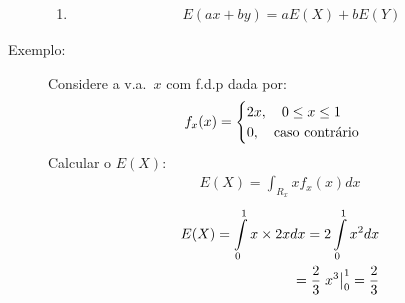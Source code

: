 \begin{description}
\begin{enumerate}[label=(\alph*)]
           \item 
           \begin{align}  E(ax + by)=aE(X)+ b E(Y)\end{align}
         \end{enumerate}
       \item [Exemplo:]Considere a v.a.\ $x$ com f.d.p dada por: 
         \begin{align*}
           f_{x}(x)=\begin{cases}
             2x,\quad 0\le x \le 1 \\
             0, \text{\quad caso contrário}
           \end{cases}
         \end{align*}
         Calcular o $E(X)$:
         \begin{align*}
           E(X)=\int_{R_{x}} x f_{x}(x)dx
         \end{align*}
         \begin{align*}
           E(X)=\int \limits_{0}^{1} x\times 2xdx=2 \int \limits_{0}^{1} x^{2}dx \\
           = \frac{2}{3} \left.x^{3}\right\rvert_{0}^{1} = \frac{2}{3}
         \end{align*}




\end{description}
